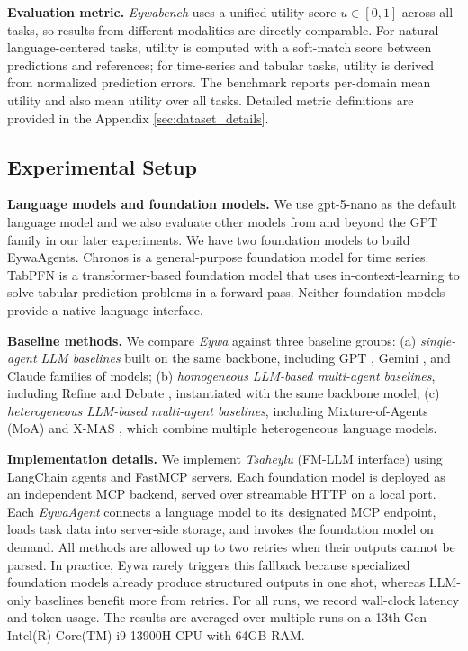 


\textbf{Evaluation metric.} \textit{Eywabench} uses a unified utility score $u \in [0,1]$ across all tasks, so results from different modalities are directly comparable.
For natural-language-centered tasks, utility is computed with a soft-match score between predictions and references; for time-series and tabular tasks, utility is derived from normalized prediction errors.
The benchmark reports per-domain mean utility and also mean utility over all tasks. Detailed metric definitions are provided in the Appendix \ref{sec:dataset_details}.

\subsection{Experimental Setup}
\textbf{Language models and foundation models.} We use gpt-5-nano as the default language model and we also evaluate other models from and beyond the GPT family in our later experiments.
We have two foundation models to build EywaAgents. Chronos \cite{DBLP:journals/tmlr/AnsariSTZMSSRPK24, DBLP:journals/corr/abs-2510-15821} is a general-purpose foundation model for time series. 
TabPFN \cite{DBLP:conf/iclr/Hollmann0EH23} is a transformer-based foundation model that uses in-context-learning to solve tabular prediction problems in a forward pass.
Neither foundation models provide a native language interface.


\textbf{Baseline methods.} We compare \textit{Eywa} against three baseline groups: (a) \emph{single-agent LLM baselines} built on the same backbone, including GPT \cite{DBLP:journals/corr/abs-2601-03267}, Gemini \cite{team2023gemini, comanici2025gemini}, and Claude \cite{claude} families of models; (b) \emph{homogeneous LLM-based multi-agent baselines}, including Refine \cite{DBLP:conf/nips/MadaanTGHGW0DPY23} and Debate \cite{DBLP:conf/icml/Du00TM24}, instantiated with the same backbone model; (c) \emph{heterogeneous LLM-based multi-agent baselines}, including Mixture-of-Agents (MoA) \cite{DBLP:conf/iclr/WangWAZZ25} and X-MAS \cite{DBLP:journals/corr/abs-2505-16997}, which combine multiple heterogeneous language models.


\textbf{Implementation details.} We implement \textit{Tsaheylu} (FM-LLM interface) using LangChain agents and FastMCP servers.
Each foundation model is deployed as an independent MCP backend, served over streamable HTTP on a local port.
Each \textit{EywaAgent} connects a language model to its designated MCP endpoint, loads task data into server-side storage, and invokes the foundation model on demand.
All methods are allowed up to two retries when their outputs cannot be parsed. In practice, Eywa rarely triggers this fallback because specialized foundation models already produce structured outputs in one shot, whereas LLM-only baselines benefit more from retries.
For all runs, we record wall-clock latency and token usage. The results are averaged over multiple runs on a 13th Gen Intel(R) Core(TM) i9-13900H CPU with 64GB RAM. 

